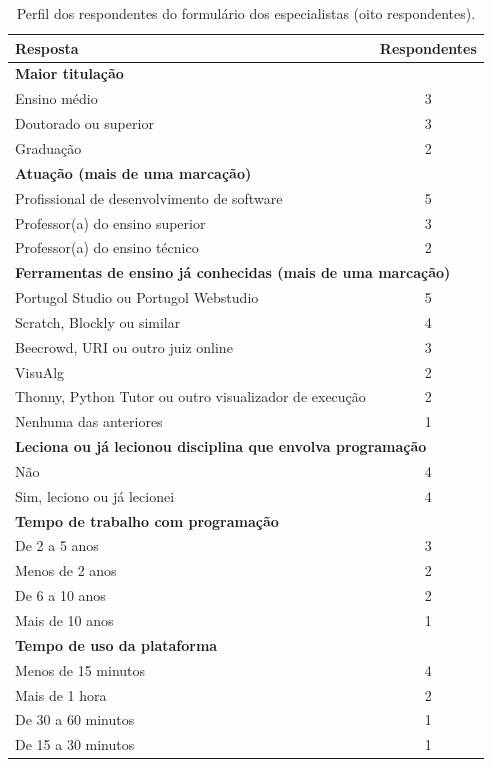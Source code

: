 \begin{table}[htbp]
\centering
\caption{Perfil dos respondentes do formulário dos especialistas (oito respondentes).}
\label{tab:ap-perfil}
\footnotesize
\renewcommand{\arraystretch}{1.2}
\begin{tabular}{|p{10.5cm}|c|}
\hline
\textbf{Resposta} & \textbf{Respondentes} \\\hline
\multicolumn{2}{|l|}{\textbf{Maior titulação}} \\\hline
Ensino médio & 3 \\\hline
Doutorado ou superior & 3 \\\hline
Graduação & 2 \\\hline
\multicolumn{2}{|l|}{\textbf{Atuação (mais de uma marcação)}} \\\hline
Profissional de desenvolvimento de software & 5 \\\hline
Professor(a) do ensino superior & 3 \\\hline
Professor(a) do ensino técnico & 2 \\\hline
\multicolumn{2}{|l|}{\textbf{Ferramentas de ensino já conhecidas (mais de uma marcação)}} \\\hline
Portugol Studio ou Portugol Webstudio & 5 \\\hline
Scratch, Blockly ou similar & 4 \\\hline
Beecrowd, URI ou outro juiz online & 3 \\\hline
VisuAlg & 2 \\\hline
Thonny, Python Tutor ou outro visualizador de execução & 2 \\\hline
Nenhuma das anteriores & 1 \\\hline
\multicolumn{2}{|l|}{\textbf{Leciona ou já lecionou disciplina que envolva programação}} \\\hline
Não & 4 \\\hline
Sim, leciono ou já lecionei & 4 \\\hline
\multicolumn{2}{|l|}{\textbf{Tempo de trabalho com programação}} \\\hline
De 2 a 5 anos & 3 \\\hline
Menos de 2 anos & 2 \\\hline
De 6 a 10 anos & 2 \\\hline
Mais de 10 anos & 1 \\\hline
\multicolumn{2}{|l|}{\textbf{Tempo de uso da plataforma}} \\\hline
Menos de 15 minutos & 4 \\\hline
Mais de 1 hora & 2 \\\hline
De 30 a 60 minutos & 1 \\\hline
De 15 a 30 minutos & 1 \\\hline
\end{tabular}
\end{table}

